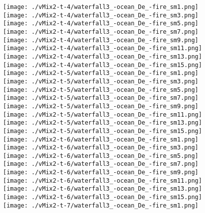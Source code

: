 \begin{figure}[ht!]
{    %
    \texttt{[image: ./vMix2-t-4/waterfall3\_-ocean\_De\_-fire\_sm1.png]}
    \texttt{[image: ./vMix2-t-4/waterfall3\_-ocean\_De\_-fire\_sm3.png]}
    \texttt{[image: ./vMix2-t-4/waterfall3\_-ocean\_De\_-fire\_sm5.png]}
    \texttt{[image: ./vMix2-t-4/waterfall3\_-ocean\_De\_-fire\_sm7.png]}
    \texttt{[image: ./vMix2-t-4/waterfall3\_-ocean\_De\_-fire\_sm9.png]}
    \texttt{[image: ./vMix2-t-4/waterfall3\_-ocean\_De\_-fire\_sm11.png]}
    \texttt{[image: ./vMix2-t-4/waterfall3\_-ocean\_De\_-fire\_sm13.png]}
    \texttt{[image: ./vMix2-t-4/waterfall3\_-ocean\_De\_-fire\_sm15.png]} \\
\vspace{1mm}
    \texttt{[image: ./vMix2-t-5/waterfall3\_-ocean\_De\_-fire\_sm1.png]}
    \texttt{[image: ./vMix2-t-5/waterfall3\_-ocean\_De\_-fire\_sm3.png]}
    \texttt{[image: ./vMix2-t-5/waterfall3\_-ocean\_De\_-fire\_sm5.png]}
    \texttt{[image: ./vMix2-t-5/waterfall3\_-ocean\_De\_-fire\_sm7.png]}
    \texttt{[image: ./vMix2-t-5/waterfall3\_-ocean\_De\_-fire\_sm9.png]}
    \texttt{[image: ./vMix2-t-5/waterfall3\_-ocean\_De\_-fire\_sm11.png]}
    \texttt{[image: ./vMix2-t-5/waterfall3\_-ocean\_De\_-fire\_sm13.png]}
    \texttt{[image: ./vMix2-t-5/waterfall3\_-ocean\_De\_-fire\_sm15.png]} \\
\vspace{1mm}
    \texttt{[image: ./vMix2-t-6/waterfall3\_-ocean\_De\_-fire\_sm1.png]}
    \texttt{[image: ./vMix2-t-6/waterfall3\_-ocean\_De\_-fire\_sm3.png]}
    \texttt{[image: ./vMix2-t-6/waterfall3\_-ocean\_De\_-fire\_sm5.png]}
    \texttt{[image: ./vMix2-t-6/waterfall3\_-ocean\_De\_-fire\_sm7.png]}
    \texttt{[image: ./vMix2-t-6/waterfall3\_-ocean\_De\_-fire\_sm9.png]}
    \texttt{[image: ./vMix2-t-6/waterfall3\_-ocean\_De\_-fire\_sm11.png]}
    \texttt{[image: ./vMix2-t-6/waterfall3\_-ocean\_De\_-fire\_sm13.png]}
    \texttt{[image: ./vMix2-t-6/waterfall3\_-ocean\_De\_-fire\_sm15.png]} \\
\vspace{1mm}
    \texttt{[image: ./vMix2-t-7/waterfall3\_-ocean\_De\_-fire\_sm1.png]}
}
\end{figure}
